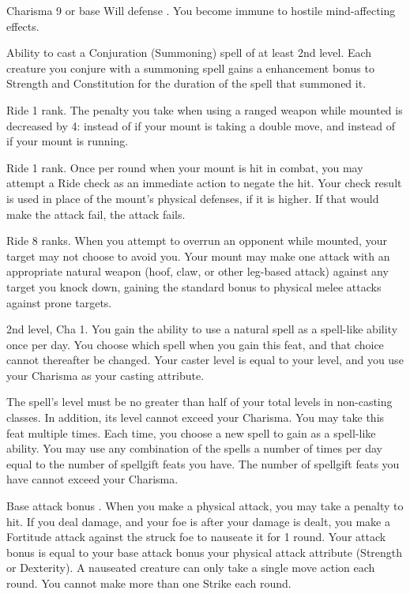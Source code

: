 \featpre Charisma 9 or base Will defense .
\featben You become immune to hostile mind-affecting effects.

 Ability to cast a Conjuration (Summoning) spell of at least 2nd level.
 Each creature you conjure with a summoning spell gains a  enhancement bonus to Strength and Constitution for the duration of the spell that summoned it.

\featpre Ride 1 rank.
 The penalty you take when using a ranged weapon while mounted is decreased by 4:  instead of  if your mount is taking a double move, and  instead of  if your mount is running.

 Ride 1 rank.
 Once per round when your mount is hit in combat, you may attempt a Ride check as an immediate action to negate the hit. Your check result is used in place of the mount's physical defenses, if it is higher. If that would make the attack fail, the attack fails.

 Ride 8 ranks.
 When you attempt to overrun an opponent while mounted, your target may not choose to avoid you. Your mount may make one attack with an appropriate natural weapon (hoof, claw, or other leg-based attack) against any target you knock down, gaining the standard  bonus to physical melee attacks against prone targets.

\featpre 2nd level, Cha 1.
\featben You gain the ability to use a natural spell as a spell-like ability once per day. You choose which spell when you gain this feat, and that choice cannot thereafter be changed. Your caster level is equal to your level, and you use your Charisma as your casting attribute.

The spell's level must be no greater than half of your total levels in non-casting classes. In addition, its level cannot exceed your Charisma.
 You may take this feat multiple times. Each time, you choose a new spell to gain as a spell-like ability. You may use any combination of the spells a number of times per day equal to the number of spellgift feats you have. The number of spellgift feats you have cannot exceed your Charisma.

\featpre Base attack bonus .
\featben When you make a physical attack, you may take a  penalty to hit. If you deal damage, and your foe is \bloodied after your damage is dealt, you make a Fortitude attack against the struck foe to nauseate it for 1 round. Your attack bonus is equal to your base attack bonus \add your physical attack attribute (Strength or Dexterity). A nauseated creature can only take a single move action each round. You cannot make more than one Strike each round.

